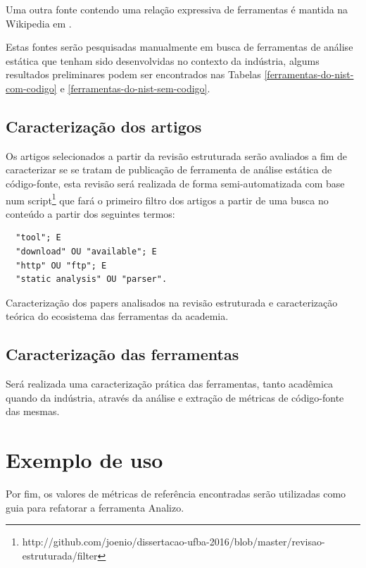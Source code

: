 \documentclass[qual, classic, a4paper]{ufbathesis}
\begin{document}
Uma outra fonte contendo uma relação expressiva de ferramentas é mantida na
Wikipedia em .

Estas fontes serão pesquisadas manualmente em busca de ferramentas de análise
estática que tenham sido desenvolvidas no contexto da indústria, algums
resultados preliminares podem ser encontrados nas Tabelas
\ref{ferramentas-do-nist-com-codigo} e \ref{ferramentas-do-nist-sem-codigo}.

\subsection{Caracterização dos artigos}

Os artigos selecionados a partir da revisão estruturada serão avaliados a fim
de caracterizar se se tratam de publicação de ferramenta de análise estática
de código-fonte, esta revisão será realizada de forma semi-automatizada com
base num
script\footnote{http://github.com/joenio/dissertacao-ufba-2016/blob/master/revisao-estruturada/filter}
que fará o primeiro filtro dos artigos a partir de uma busca no conteúdo a
partir dos seguintes termos:

\begin{verbatim}
  "tool"; E
  "download" OU "available"; E
  "http" OU "ftp"; E
  "static analysis" OU "parser".
\end{verbatim}

Caracterização dos papers analisados na revisão estruturada e caracterização
teórica do ecosistema das ferramentas da academia.

\subsection{Caracterização das ferramentas}

Será realizada uma caracterização prática das ferramentas, tanto acadêmica
quando da indústria, através da análise e extração de métricas de código-fonte
das mesmas.


\section{Exemplo de uso}

Por fim, os valores de métricas de referência encontradas serão utilizadas
como guia para refatorar a ferramenta Analizo.
\end{document}
